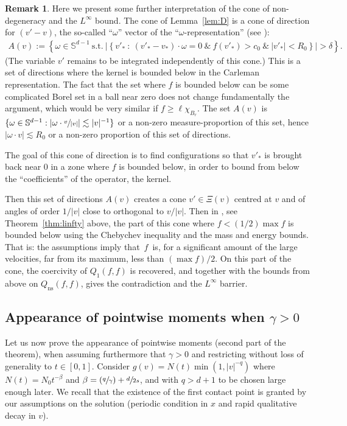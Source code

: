 \documentclass[JEP,XML,SOM,Unicode,NoFloatCountersInSection]{cedram}
\newcommand{\Psfrac}[2]{(\sfrac{#1}{#2})}
\newcommand{\ns}{\mathrm{ns}}
\theoremstyle{plain}
\theoremstyle{definition}
\newtheorem{remark}[thm]{Remark}
\numberwithin{equation}{section}
\let\A N
\newcommand{\Ao}{N_0}
\begin{document}
\begin{remark} Here we present some further interpretation of the cone
of non-degeneracy and the $L^\infty$ bound. The cone of
Lemma~\ref{lem:D} is a cone of direction for $(v'-v)$, \ie the
so-called ``$\omega$'' vector of the ``$\omega$-representation''
(see \cite[\S 4.6]{villani-book}):
\begin{align*}
A(v) :=
\left\{ \omega \in \mathbb S^{d-1} \
\mbox{s.t.} \ \left| \left\{ v'_* \ : \ (v'_*-v_*)
\cdot \omega =0 \ \& \ f(v'_*) > c_0 \ \& \ |v'_*| < R_0 \right\}
\right| > \delta \right\}.
\end{align*}
(The variable $v'$ remains to be integrated independently of this
cone.) This is a set of directions where the kernel is bounded below
in the Carleman representation. The fact that the set where $f$ is
bounded below can be some complicated Borel set in a ball near zero
does not change fundamentally the argument, which would be very
similar if $f \ge \ell \chi_{B_r}$. The set $A(v)$ is
$\{ \omega \in \mathbb S^{d-1}: |\omega \cdot \sfrac{v}{|v|}| \lesssim |v|^{-1}\}$ or a non-zero
measure-proportion of this set, hence $|\omega \cdot v| \lesssim R_0$
or a non-zero proportion of this set of directions.

The goal of this cone of direction is to find configurations so
that $v'_*$ is brought back near $0$ in a zone where $f$ is bounded
below, in order to bound from below the ``coefficients'' of the
operator, \ie the kernel.

Then this set of directions $A(v)$ creates a cone $v' \in \Xi(v)$
centred at $v$ and of angles of order $1/|v|$ close to orthogonal to
$v/|v|$. Then in \cite{luis}, see Theorem~\ref{thm:linfty} above,
the part of this cone where $f < (1/2) \max f$ is bounded below using
the Chebychev inequality and the mass and energy bounds. That is: the
assumptions imply that~$f$~is, for a significant amount of the large
velocities, far from its maximum, \ie less than $(\max f)/2$. On this
part of the cone, the coercivity of $Q_1(f,f)$ is recovered, and together
with the bounds from above on $Q_{\ns}(f,f)$, gives the contradiction and the
$L^\infty$ barrier.
\end{remark}

\subsection{Appearance of pointwise moments when $\gamma>0$}
\label{s:appearance-hard}

Let us now prove the appearance of pointwise moments (second part of
the theorem), when assuming furthermore that $\gamma >0$ and
restricting without loss of generality to $t \in [0,1]$. Consider
$g(v) = \A(t) \min\left(1,|v|^{-q} \right)$ where
$\A(t) = \Ao t^{-\beta}$ and $\beta = \Psfrac q \gamma + \sfrac{d}{2s}$,
and with $q >d+1$ to be chosen large enough later. We recall that the
existence of the first contact point is granted by our assumptions on
the solution (periodic condition in $x$ and rapid qualitative decay in
$v$).
\end{document}
